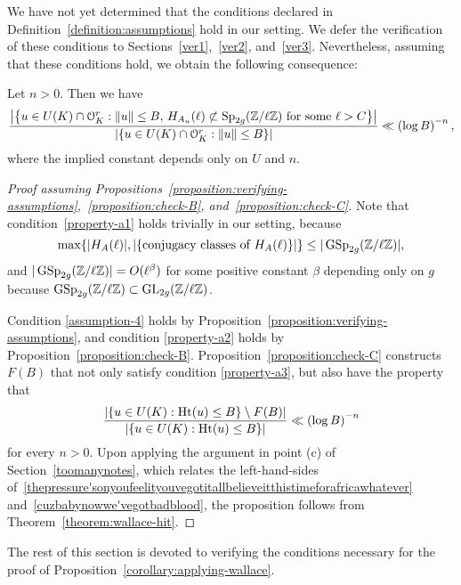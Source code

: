 We have not yet determined that the conditions declared in Definition~\ref{definition:assumptions} hold in our setting. We defer the verification of these conditions to Sections~\ref{ver1},~\ref{ver2}, and~\ref{ver3}. Nevertheless, assuming that these conditions hold, we obtain the following consequence:
	\begin{proposition} \label{corollary:applying-wallace}
		Let $n>0$. Then we have
		\begin{equation}\label{cuzbabynowwe'vegotbadblood}
			\frac{\left|\left\{ u \in U(K) \cap \mathcal{O}_K^r : \|u \| \leq B,\, H_{A_u}(\ell) \not \subset \operatorname{Sp}_{2g}(\mathbb Z/ \ell \mathbb Z) \text{ for some } \ell  > C \right\}\right|}{\left|\left\{ u \in U(K) \cap \mathcal O_K^r : \|u \| \leq B \right\} \right|} \ll \left( \log B \right)^{-n},
		\end{equation}
        where the implied constant depends only on $U$ and $n$.
	\end{proposition}
	\begin{proof}[Proof assuming Propositions~\ref{proposition:verifying-assumptions},~\ref{proposition:check-B}, and~\ref{proposition:check-C}]
Note that condition~\ref{property-a1} holds trivially in our setting, because
\[
	\max\{|H_A(\ell)|, |\{\text{conjugacy classes of $H_A(\ell)$}\}|\} \leq |\operatorname{GSp}_{2g}(\mathbb Z/\ell \mathbb Z)|,
\]
and $|\operatorname{GSp}_{2g}(\mathbb Z/\ell \mathbb Z)| = O(\ell^\beta)$ for some positive constant $\beta$ depending only on $g$ because $\operatorname{GSp}_{2g}({\mathbb Z}/\ell{\mathbb Z}) \subset \operatorname{GL}_{2g}({\mathbb Z}/\ell{\mathbb Z})$.

Condition \ref{assumption-4} holds by Proposition~\ref{proposition:verifying-assumptions}, and condition \ref{property-a2} holds by Proposition~\ref{proposition:check-B}. Proposition~\ref{proposition:check-C} constructs $F(B)$ that not only satisfy condition \ref{property-a3}, but also have the property that
		\begin{equation*}
			\frac{|\{u \in U(K) : \operatorname{Ht}(u) \le B\} \setminus F(B) |}{|\{u \in U(K) : \operatorname{Ht}(u) \le B\}|} \ll \left( \log B \right)^{-n}
            \end{equation*}
            for every $n >0$. Upon applying the argument in point (c) of Section~\ref{toomanynotes}, which relates the left-hand-sides of~\eqref{thepressure'sonyoufeelityouvegotitallbelieveitthistimeforafricawhatever} and~\eqref{cuzbabynowwe'vegotbadblood}, the proposition follows from Theorem~\ref{theorem:wallace-hit}.		
	\end{proof}

The rest of this section is devoted to verifying the conditions necessary for the proof of Proposition~\ref{corollary:applying-wallace}.
	
